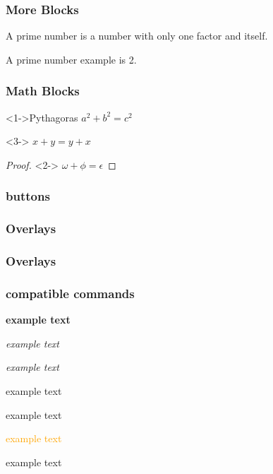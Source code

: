 \documentclass{beamer}
\begin{document}
\begin{frame}
\frametitle{More Blocks}
\begin{definition}
A prime number is a number with only one factor and itself.
\end{definition}
\begin{example}
A prime number example is 2.
\end{example}
\end{frame}

\begin{frame}
\frametitle{Math Blocks}
\begin{theorem}<1->{Pythagoras}
$ a^2 + b^2 = c^2$
\end{theorem}
\begin{corollary}<3->
$ x + y = y + x  $
\end{corollary}
\begin{proof}<2->
$\omega +\phi = \epsilon $
\end{proof}
\end{frame}

\begin{frame}
\frametitle{buttons}
\hyperlink{contents}{}

\hyperlink{codes}{}

\hyperlink{movies}{}

\hyperlink{movies}{}
\end{frame}

\begin{frame}
\frametitle{Overlays}\vspace{2pt}


\end{frame}

\begin{frame}
\frametitle{Overlays}


\end{frame}

\begin{frame}
\frametitle{compatible commands}
\textbf<2>{example text}

\textsl<3>{example text}

\textit<4>{example text}

\textrm<5>{example text}

\textsf<6>{example text}

\textcolor<7>{orange}{example text}

\alert<8>{example text}

\end{frame}
\end{document}
